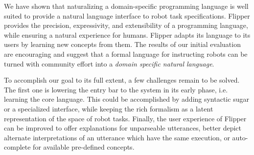\documentclass[letterpaper, 10 pt, conference]{ieeeconf}  %
\newcommand{\tool}{Flipper\xspace}
\begin{document}
We have shown that naturalizing a domain-specific programming language is well suited
to provide a natural language interface to robot task specifications.
\tool provides the precision, expressivity, and extensibility of a programming
language, while ensuring a natural experience for humans.
\tool adapts its language to its users by learning new concepts from them. 
The results of our initial evaluation are encouraging and suggest
that a formal language for instructing robots can be turned with community
effort into a \emph{domain specific natural language}.

To accomplish our goal to its full extent, a few challenges remain to be solved.
The first one is lowering the entry bar to the system in its early phase, i.e.
learning the core language.
This could be accomplished by adding syntactic sugar or a specialized interface,
while keeping the rich formalism as a latent representation of
the space of robot tasks.
Finally, the user experience of \tool can be improved to offer explanations for
unparseable utterances, better depict alternate interpretations of an utterance
which have the same execution, or auto-complete for available pre-defined concepts.


\balance







\end{document}
